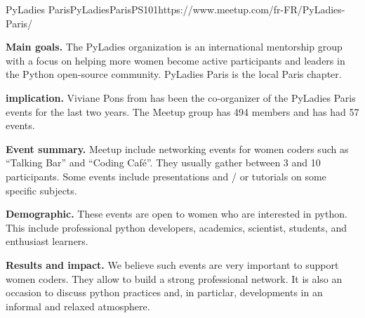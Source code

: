 \begin{event}{PyLadies Paris}{PyLadies}{Paris}{PS}{10}{1}{https://www.meetup.com/fr-FR/PyLadies-Paris/}

\textbf{Main goals.} The PyLadies organization is an international mentorship group with a focus on helping more women become active participants and leaders in the Python open-source community. PyLadies Paris is the local Paris chapter.

\textbf{\ODK implication.} Viviane Pons from \ODK has been the co-organizer of the PyLadies Paris events for the last two years. The Meetup group has 494 members and has had 57 events.

\textbf{Event summary.} Meetup include networking events for women coders such as ``Talking Bar'' and ``Coding Café''. They usually gather between 3 and 10 participants. Some events include presentations and / or tutorials on some specific subjects.

\textbf{Demographic.} These events are open to women who are interested in python. This include professional python developers, academics, scientist, students, and enthusiast learners.

\textbf{Results and impact.} We believe such events are very important to support women coders. They allow to build a strong professional network. It is also an occasion to discuss python practices and, in particlar, \ODK developments in an informal and relaxed atmosphere.

\end{event}
